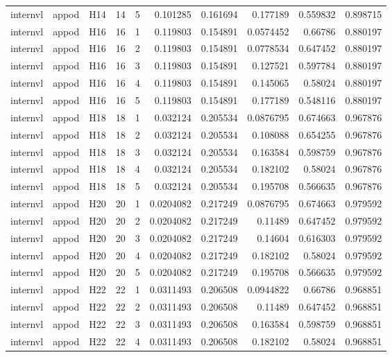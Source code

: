 \begin{longtable}{lllrrrrrrr}
internvl & appod & H14 & 14 & 5 & 0.101285 & 0.161694 & 0.177189 & 0.559832 & 0.898715 \\
internvl & appod & H16 & 16 & 1 & 0.119803 & 0.154891 & 0.0574452 & 0.66786 & 0.880197 \\
internvl & appod & H16 & 16 & 2 & 0.119803 & 0.154891 & 0.0778534 & 0.647452 & 0.880197 \\
internvl & appod & H16 & 16 & 3 & 0.119803 & 0.154891 & 0.127521 & 0.597784 & 0.880197 \\
internvl & appod & H16 & 16 & 4 & 0.119803 & 0.154891 & 0.145065 & 0.58024 & 0.880197 \\
internvl & appod & H16 & 16 & 5 & 0.119803 & 0.154891 & 0.177189 & 0.548116 & 0.880197 \\
internvl & appod & H18 & 18 & 1 & 0.032124 & 0.205534 & 0.0876795 & 0.674663 & 0.967876 \\
internvl & appod & H18 & 18 & 2 & 0.032124 & 0.205534 & 0.108088 & 0.654255 & 0.967876 \\
internvl & appod & H18 & 18 & 3 & 0.032124 & 0.205534 & 0.163584 & 0.598759 & 0.967876 \\
internvl & appod & H18 & 18 & 4 & 0.032124 & 0.205534 & 0.182102 & 0.58024 & 0.967876 \\
internvl & appod & H18 & 18 & 5 & 0.032124 & 0.205534 & 0.195708 & 0.566635 & 0.967876 \\
internvl & appod & H20 & 20 & 1 & 0.0204082 & 0.217249 & 0.0876795 & 0.674663 & 0.979592 \\
internvl & appod & H20 & 20 & 2 & 0.0204082 & 0.217249 & 0.11489 & 0.647452 & 0.979592 \\
internvl & appod & H20 & 20 & 3 & 0.0204082 & 0.217249 & 0.14604 & 0.616303 & 0.979592 \\
internvl & appod & H20 & 20 & 4 & 0.0204082 & 0.217249 & 0.182102 & 0.58024 & 0.979592 \\
internvl & appod & H20 & 20 & 5 & 0.0204082 & 0.217249 & 0.195708 & 0.566635 & 0.979592 \\
internvl & appod & H22 & 22 & 1 & 0.0311493 & 0.206508 & 0.0944822 & 0.66786 & 0.968851 \\
internvl & appod & H22 & 22 & 2 & 0.0311493 & 0.206508 & 0.11489 & 0.647452 & 0.968851 \\
internvl & appod & H22 & 22 & 3 & 0.0311493 & 0.206508 & 0.163584 & 0.598759 & 0.968851 \\
internvl & appod & H22 & 22 & 4 & 0.0311493 & 0.206508 & 0.182102 & 0.58024 & 0.968851 \\

\end{longtable}
